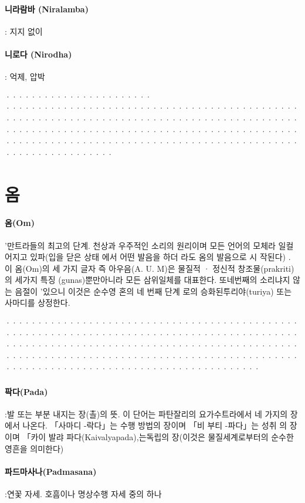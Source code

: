 \documentclass[12pt, a4paper, oneside]{book}
\let\stdsection\section
\renewcommand\section{\newpage\stdsection}
\begin{document}
\paragraph{니라람바 (Niralamba)} : 지지 없이

\paragraph{니로다 (Nirodha)} : 억제, 압박

·······················
·········································································································································································································

\newpage
\section{옴}

\paragraph{옴(Om)} '만트라들의 최고의 단계. 천상과 우주적인 소리의 원리이며 모든 언어의 모체라 일컬어지고 있파(입을 닫은 상태 에서 어떤 발음을 하더 라도 옴의 발음으로 시 작된다) .   이 옴(Om)의 세 가지 글자 즉 아우음(A. U. M)은 물질적 · 정신적 창조물(prakriti)의 세가지 특징 (gunas)뿐만아니라 모든 삼위일체를 대표한다. 또네번째의 소리냐지 않는 음절이 '있으니 이것은 순수영 혼의 네 번째 단계 로의 승화된투리야(turiya) 또는 사마디를 상정한다.

································································································································································································································

\paragraph{팍다(Pada)} :발 또는 부분 내지는 장(촐)의 뜻. 이 단어는 파탄잘리의 요가수트라에서 네 가지의 장에서 나온다. 「사마디 -락다」는 수행 방법의 장이며 「비 부티 -파다」는 성취   의 장이며 「카이 발랴 파다(Kaivalyapada),는독립의 장(이것은 물질세계로부터의 순수한 영흔을 의미한다)

\paragraph{파드마사나(Padmasana)} :연꽃 자세. 호흠이나 명상수행 자세 중의 하나
\end{document}
